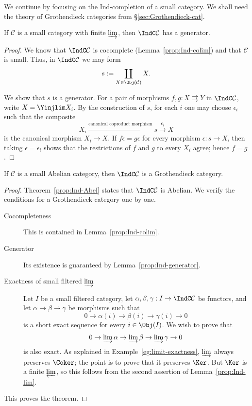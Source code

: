 We continue by focusing on the Ind-completion of a small category. We shall need the theory of Grothendieck categories from \S\ref{sec:Grothendieck-cat}.

\begin{lemma}\label{prop:Ind-generator}
	If $\mathcal{C}$ is a small category with finite $\varinjlim$, then $\IndC\mathcal{C}$ has a generator.
\end{lemma}
\begin{proof}
	We know that $\IndC\mathcal{C}$ is cocomplete (Lemma~\ref{prop:Ind-colim}) and that $\mathcal{C}$ is small. Thus, in $\IndC\mathcal{C}$ we may form
	\[ s := \coprod_{X \in \Obj(\mathcal{C})} X. \]

	We show that $s$ is a generator. For a pair of morphisms $f,g:X\rightrightarrows Y$ in $\IndC\mathcal{C}$, write $X=\Yinjlim X_i$. By the construction of $s$, for each $i$ one may choose $\epsilon_i$ such that the composite
	\[ X_i \xrightarrow{\text{canonical coproduct morphism}} s \xrightarrow{\epsilon_i} X \]
	is the canonical morphism $X_i\to X$. If $f\epsilon=g\epsilon$ for every morphism $\epsilon:s\to X$, then taking $\epsilon=\epsilon_i$ shows that the restrictions of $f$ and $g$ to every $X_i$ agree; hence $f=g$.
\end{proof}

\begin{theorem}\label{prop:Ind-Grothendieck}
	If $\mathcal{C}$ is a small Abelian category, then $\IndC\mathcal{C}$ is a Grothendieck category.
\end{theorem}
\begin{proof}
	Theorem~\ref{prop:Ind-Abel} states that $\IndC\mathcal{C}$ is Abelian. We verify the conditions for a Grothendieck category one by one.
	\begin{description}
		\item[Cocompleteness] This is contained in Lemma~\ref{prop:Ind-colim}.
		\item[Generator] Its existence is guaranteed by Lemma~\ref{prop:Ind-generator}.
		\item[Exactness of small filtered $\varinjlim$] Let $I$ be a small filtered category, let $\alpha,\beta,\gamma:I\to\IndC\mathcal{C}$ be functors, and let $\alpha\to\beta\to\gamma$ be morphisms such that
		\[ 0 \to \alpha(i) \to \beta(i) \to \gamma(i) \to 0 \]
		is a short exact sequence for every $i\in\Obj(I)$. We wish to prove that
		\[ 0 \to \varinjlim \alpha \to \varinjlim \beta \to \varinjlim \gamma \to 0 \]
		is also exact. As explained in Example~\ref{eg:limit-exactness}, $\varinjlim$ always preserves $\Coker$; the point is to prove that it preserves $\Ker$. But $\Ker$ is a finite $\varprojlim$, so this follows from the second assertion of Lemma~\ref{prop:Ind-lim}.
	\end{description}
	This proves the theorem.
\end{proof}
